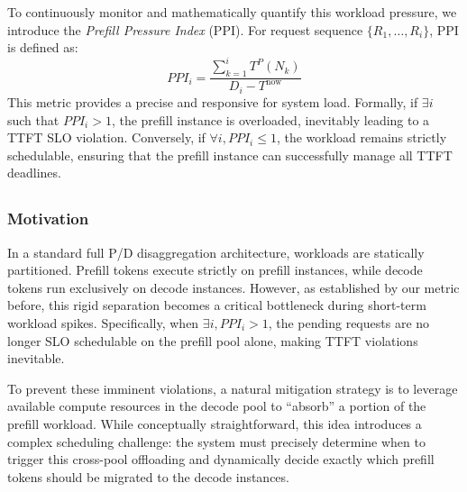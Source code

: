 To continuously monitor and mathematically quantify this workload pressure, we introduce the \textit{Prefill Pressure Index} (PPI).
For request sequence $\{R_1, \dots, R_i\}$, PPI is defined as:
\begin{equation}
    PPI_i = \frac{\sum_{k=1}^{i}{T^P(N_k)}}{D_i - T^{\text{now}}}
\end{equation}
This metric provides a precise and responsive for system load.
Formally, if $\exists i$ such that $PPI_i > 1$, the prefill instance is overloaded, inevitably leading to a TTFT SLO violation.
Conversely, if $\forall i, PPI_i \le 1$, the workload remains strictly schedulable, ensuring that the prefill instance can successfully manage all TTFT deadlines.

\subsection{\instance}
\label{subsec:instance-level}

\subsubsection{Motivation}
\label{subsubsec:instance-level-motivation}



In a standard full P/D disaggregation architecture, workloads are statically partitioned.
Prefill tokens execute strictly on prefill instances, while decode tokens run exclusively on decode instances. However, as established by our metric before, this rigid separation becomes a critical bottleneck during short-term workload spikes.
Specifically, when $\exists i, PPI_i > 1$, the pending requests are no longer SLO schedulable on the prefill pool alone, making TTFT violations inevitable.

To prevent these imminent violations, a natural mitigation strategy is to leverage available compute resources in the decode pool to ``absorb'' a portion of the prefill workload.
While conceptually straightforward, this idea introduces a complex scheduling challenge: the system must precisely determine when to trigger this cross-pool offloading and dynamically decide exactly which prefill tokens should be migrated to the decode instances.




